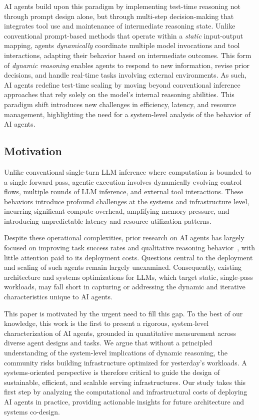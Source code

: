AI agents build upon this paradigm by implementing test-time reasoning not through prompt design alone, but through multi-step decision-making that integrates tool use and maintenance of intermediate reasoning state. Unlike conventional prompt-based methods that operate within a \emph{static} input-output mapping, agents \emph{dynamically} coordinate multiple model invocations and tool interactions, adapting their behavior based on intermediate outcomes. This form of \emph{dynamic reasoning} enables agents to respond to new information, revise prior decisions, and handle real-time tasks involving external environments.
As such, AI agents redefine test-time scaling by moving beyond conventional inference approaches that rely solely on the model’s internal reasoning abilities.
This paradigm shift introduces new challenges in efficiency, latency, and resource management, highlighting the need for a system-level analysis of the behavior of AI agents.

\subsection{Motivation}

Unlike conventional single-turn LLM inference where computation is bounded to a single forward pass, agentic execution involves dynamically evolving control flows, multiple rounds of LLM inference, and external tool interactions. These behaviors introduce profound challenges at the systems and infrastructure level, incurring significant compute overhead, amplifying memory pressure, and introducing unpredictable latency and resource utilization patterns.

Despite these operational complexities, prior research on AI agents has largely focused on improving task success rates and qualitative reasoning behavior~\cite{react, reflexion, lats}, with little attention paid to its deployment costs. Questions central to the deployment and scaling of such agents remain largely unexamined. Consequently, existing architecture and systems optimizations for LLMs, which target static, single-pass workloads, may fall short in capturing or addressing the dynamic and iterative characteristics unique to AI agents.

This paper is motivated by the urgent need to fill this gap. To the best of our knowledge, this work is the first to present a rigorous, system-level characterization of AI agents, grounded in quantitative measurement across diverse agent designs and tasks. We argue that without a principled understanding of the system-level implications of dynamic reasoning, the community risks building infrastructure optimized for yesterday’s workloads. A systems-oriented perspective is therefore critical to guide the design of sustainable, efficient, and scalable serving infrastructures. Our study takes this first step by analyzing the computational and infrastructural costs of deploying AI agents in practice, providing actionable insights for future architecture and systems co-design.




